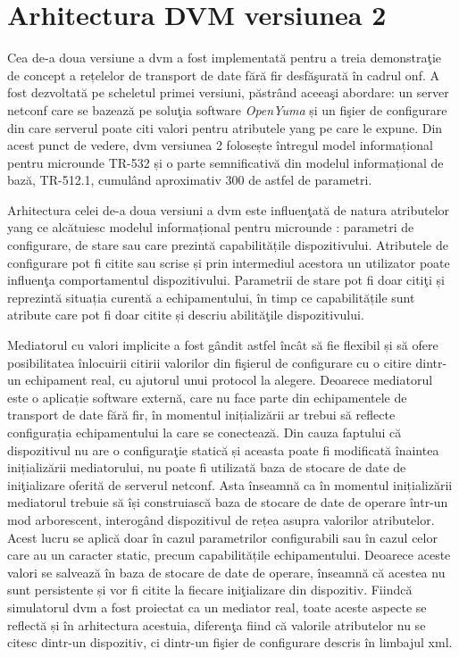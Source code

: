 \section{Arhitectura DVM versiunea 2}

Cea de-a doua versiune a \gls{dvm} a fost implementată pentru a treia demonstraţie de concept a rețelelor de transport de date fără fir desfăşurată în cadrul \gls{onf}. A fost dezvoltată pe scheletul primei versiuni, păstrând aceeaşi abordare: un server \gls{netconf} care se bazează pe soluţia software \textit{OpenYuma} și un fişier de configurare din care serverul poate citi valori pentru atributele \gls{yang} pe care le expune. Din acest punct de vedere, \gls{dvm} versiunea 2 folosește întregul model informațional pentru microunde TR-532 și o parte semnificativă din modelul informațional de bază, TR-512.1, cumulând aproximativ 300 de astfel de parametri.

Arhitectura celei de-a doua versiuni a \gls{dvm} este influenţată de natura atributelor \gls{yang} ce alcătuiesc modelul informațional pentru microunde \cite{stancu2017enabling}: parametri de configurare, de stare sau care prezintă capabilitățile dispozitivului. Atributele de configurare pot fi citite sau scrise și prin intermediul acestora un utilizator poate influenţa comportamentul dispozitivului. Parametrii de stare pot fi doar citiţi și reprezintă situația curentă a echipamentului, în timp ce capabilitățile sunt atribute care pot fi doar citite și descriu abilităţile dispozitivului.

Mediatorul cu valori implicite a fost gândit astfel încât să fie flexibil și să ofere posibilitatea înlocuirii citirii valorilor din fişierul de configurare cu o citire dintr-un echipament real, cu ajutorul unui protocol la alegere. Deoarece mediatorul este o aplicație software externă, care nu face parte din echipamentele de transport de date fără fir, în momentul inițializării ar trebui să reflecte configurația echipamentului la care se conectează. Din cauza faptului că dispozitivul nu are o configuraţie statică și aceasta poate fi modificată înaintea inițializării mediatorului, nu poate fi utilizată baza de stocare de date de iniţializare oferită de serverul \gls{netconf}. Asta înseamnă ca în momentul inițializării mediatorul trebuie să își construiască baza de stocare de date de operare într-un mod arborescent, interogând dispozitivul de rețea asupra valorilor atributelor. Acest lucru se aplică doar în cazul parametrilor configurabili sau în cazul celor care au un caracter static, precum capabilitățile echipamentului. Deoarece aceste valori se salvează în baza de stocare de date de operare, înseamnă că acestea nu sunt persistente și vor fi citite la fiecare iniţializare din dispozitiv. Fiindcă simulatorul \gls{dvm} a fost proiectat ca un mediator real, toate aceste aspecte se reflectă și în arhitectura acestuia, diferenţa fiind că valorile atributelor nu se citesc dintr-un dispozitiv, ci dintr-un fişier de configurare descris în limbajul \gls{xml}.

